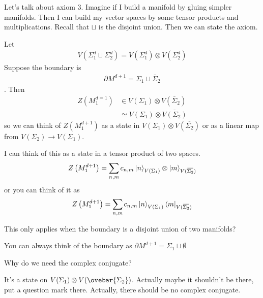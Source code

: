 Let's talk about axiom 3.
Imagine if I build a manifold by gluing simpler manifolds.
Then I can build my vector spaces by some tensor products and multiplications.
Recall that $\sqcup$ is the disjoint union.
Then we can state the axiom.
\begin{axiom}[Axiom 3]
    Let
    \begin{align}
        V\left( \Sigma_1^d \sqcup \Sigma_2^d  \right)
        =
        V\left( \Sigma_1^d \right) \otimes
        V\left( \Sigma_2^d \right)
    \end{align}
    Suppose the boundary is
    \begin{align}
        \partial M^{d+1} =
        \Sigma_1 \sqcup \bar{\Sigma}_2
    \end{align}.
    Then
    \begin{align}
        Z\left( M_1^{d=1} \right) &\in
        V\left( \Sigma_1 \right) \otimes V\left( \bar{\Sigma}_2 \right)\\
        &\simeq V\left( \Sigma_1 \right) \otimes \overbar{V(\Sigma_2)}
    \end{align}
    so we can think of $Z\left( M^{d+1}_1 \right)$
    as a state in
    $V\left( \Sigma_1 \right)\otimes V\left( \overbar{\Sigma_2} \right)$
    or as a linear map from
    $V\left( \Sigma_2 \right)\to V\left( \Sigma_1 \right)$.
\end{axiom}
I can think of this as a state in a tensor product of two spaces.
\begin{align}
    Z\left( M_1^{d+1} \right)
    = \sum_{n,m} c_{n,m}
    \ket{n}_{V(\Sigma_1)}
    \otimes \ket{m}_{V(\overbar{\Sigma_2})}
\end{align}
or you can think of it as
\begin{align}
    Z\left( M_1^{d+1} \right)
    = \sum_{n,m} c_{n,m}
    \ket{n}_{V(\Sigma_1)}
    \bra{m}_{V(\overbar{\Sigma_2})}
\end{align}

\begin{question}
This only applies when the boundary is a disjoint union of two manifolds?
\end{question}
You can always think of the boundary as $\partial M^{d+1}=\Sigma_1 \sqcup
\emptyset$

\begin{question}
    Why do we need the complex conjugate?
\end{question}
It's a state on $V(\Sigma_1)\otimes V(\ovebar{\Sigma_2})$.
Actually maybe it shouldn't be there,
put a question mark there.
Actually, there should be no complex conjugate.

